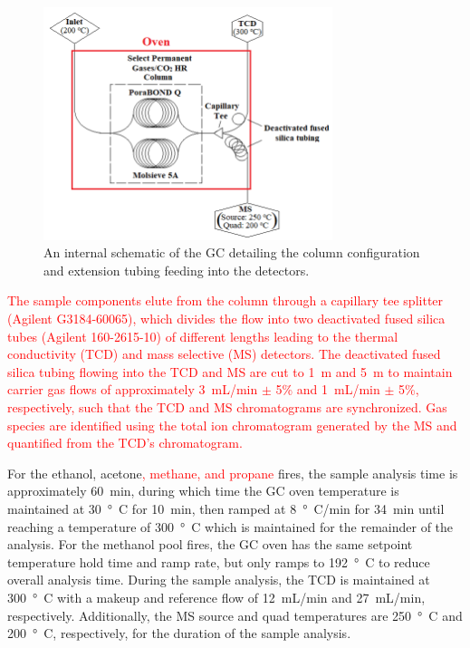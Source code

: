 \documentclass[12pt]{article}
\begin{document}
\begin{figure}[h!]
	\centering
\includegraphics[width=8.45cm,keepaspectratio]{GC_Internal.png}
	\caption[A schematic of the internal plumbing system in the gas chromatograph]{An internal schematic of the GC detailing the column configuration and extension tubing feeding into the detectors.}
	\label{fig:GC_Intern}
\end{figure}

\textcolor{red}{The sample components elute from the column through a capillary tee splitter (Agilent G3184-60065), which divides the flow into two deactivated fused silica tubes (Agilent 160-2615-10) of different lengths leading to the thermal conductivity (TCD) and mass selective (MS) detectors. The deactivated fused silica tubing flowing into the TCD and MS are cut to 1~m and 5~m to maintain carrier gas flows of approximately 3~mL/min $\pm$ 5\% and 1~mL/min $\pm$ 5\%, respectively, such that the TCD and MS chromatograms are synchronized. Gas species are identified using the total ion chromatogram generated by the MS and quantified from the TCD's chromatogram.}

For the ethanol, acetone\textcolor{red}{, methane, and propane} fires, the sample analysis time is approximately \SI{60}{min}, during which time the GC oven temperature is maintained at \SI{30}{\degree C} for \SI{10}{min}, then ramped at \SI{8}{\degree C/min} for \SI{34}{min} until reaching a temperature of \SI{300}{\degree C} which is maintained for the remainder of the analysis. For the methanol pool fires, the GC oven has the same setpoint temperature hold time and ramp rate, but only ramps to \SI{192}{\degree C} to reduce overall analysis time. During the sample analysis, the TCD is maintained at \SI{300}{\degree C} with a makeup and reference flow of 12~mL/min and 27~mL/min, respectively. Additionally, the MS source and quad temperatures are \SI{250}{\degree C} and \SI{200}{\degree C}, respectively, for the duration of the sample analysis.
\end{document}
